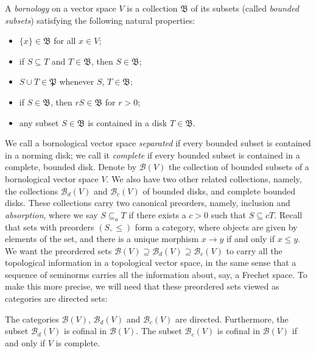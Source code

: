 \begin{definition}[Bornology]
A \emph{bornology} on a vector space \(V\) is a collection \(\mathfrak{B}\) of its subsets (called \emph{bounded subsets}) satisfying the following natural properties:

\begin{itemize}
\item \(\{x\} \in \mathfrak{B}\) for all \(x \in V\);
\item if \(S \subseteq T\) and \(T \in \mathfrak{B}\), then \(S \in \mathfrak{B}\);
\item \(S \cup T \in \mathfrak{P}\) whenever \(S\), \(T \in \mathfrak{B}\);
\item if \(S \in \mathfrak{B}\), then \(r S \in \mathfrak{B}\) for \(r>0\);
\item any subset \(S \in \mathfrak{B}\) is contained in a disk \(T \in \mathfrak{B}\). 
\end{itemize}


\end{definition}

We call a bornological vector space \emph{separated} if every bounded subset is contained in a norming disk; we call it \emph{complete} if every bounded subset is contained in a complete, bounded disk. Denote by \(\mathcal{B}(V)\) the collection of bounded subsets of a bornological vector space \(V\). We also have two other related collections, namely, the collections \(\mathcal{B}_d(V)\) and \(\mathcal{B}_c(V)\) of bounded disks, and complete bounded disks. These collections carry two canonical preorders, namely, inclusion and \emph{absorption}, where we say \(S \subseteq_a T\) if there exists a \(c>0\) such that \( S \subseteq c T\). Recall that sets with preorders \((S, \leq)\) form a category, where objects are given by elements of the set, and there is a unique morphism \(x \to y\) if and only if \(x \leq y\). We want the preordered sets \(\mathcal{B}(V) \supseteq \mathcal{B}_d(V) \supseteq \mathcal{B}_c(V)\) to carry all the topological information in a topological vector space, in the same sense that a sequence of seminorms carries all the information about, say, a Frechet space. To make this more precise, we will need that these preordered sets viewed as categories are directed sets:

\begin{lemma}\label{lem:bornologies-directed}
The categories \(\mathcal{B}(V)\), \(\mathcal{B}_d(V)\) and \(\mathcal{B}_c(V)\) are directed. Furthermore, the subset \(\mathcal{B}_d(V)\) is cofinal in \(\mathcal{B}(V)\). The subset \(\mathcal{B}_c(V)\) is cofinal in \(\mathcal{B}(V)\) if and only if \(V\) is complete.  
\end{lemma}

